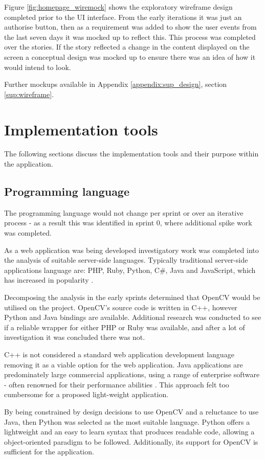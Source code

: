 Figure \ref{fig:homepage_wiremock} shows the exploratory wireframe design completed prior to the UI interface. From the early iterations it was just an authorise button, then as a requirement was added to show the user events from the last seven days it was mocked up to reflect this. This process was completed over the stories. If the story reflected a change in the content displayed on the screen a conceptual design was mocked up to ensure there was an idea of how it would intend to look.


Further mockups available in Appendix \ref{appendix:sup_design}, section \ref{sup:wireframe}.


\section{Implementation tools}
The following sections discuss the implementation tools and their purpose within the application.
\subsection{Programming language}
The programming language would not change per sprint or over an iterative process - as a result this was identified in sprint 0, where additional spike work was completed.

As a web application was being developed investigatory work was completed into the analysis of suitable server-side languages. Typically traditional server-side applications language are: PHP, Ruby, Python, C\#, Java and JavaScript, which has increased in popularity \cite{citeulike:14018462}.

Decomposing the analysis in the early sprints determined that OpenCV would be utilised on the project. OpenCV's source code is written in C++, however Python and Java bindings are available. Additional research was conducted to see if a reliable wrapper for either PHP or Ruby was available, and after a lot of investigation it was concluded there was not.

C++ is not considered a standard web application development language removing it as a viable option for the web application. Java applications are predominately large commercial applications, using a range of enterprise software - often renowned for their performance abilities \cite{citeulike:14019744}. This approach felt too cumbersome for a proposed light-weight application.

By being constrained by design decisions to use OpenCV and a reluctance to use Java, then Python was selected as the most suitable language. Python offers a lightweight and an easy to learn syntax that produces readable code, allowing a object-oriented paradigm to be followed. Additionally, its support for OpenCV is sufficient for the application.

